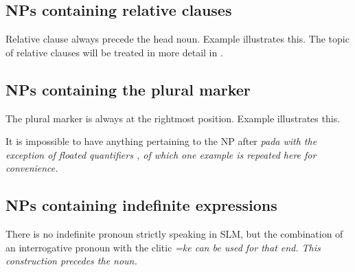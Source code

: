 \subsection{NPs containing relative clauses}\label{sec:nppp:NPscontainingrelativeclauses}
Relative clause always precede the head noun. Example  illustrates this. The topic of relative clauses will be treated in more detail in .


\subsection{NPs containing the plural marker}\label{sec:nppp:NPscontainingthepluralmarker}
The plural marker is always at the rightmost position.
Example  illustrates this.


It is impossible to have anything pertaining to the NP after \em pada \em with the exception of floated quantifiers , of which one example is repeated here for convenience.



\subsection{NPs containing indefinite expressions}\label{sec:nppp:NPscontainingindefiniteexpressions}
There is no indefinite pronoun strictly speaking in SLM, but the combination of an interrogative pronoun with the clitic  \em =ke \em can be used for that end.  This construction precedes the noun.

